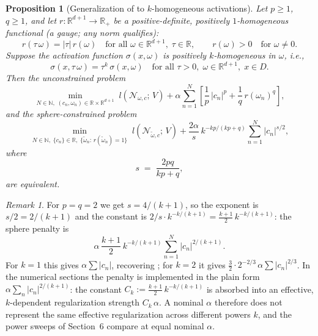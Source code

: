 \documentclass[11pt]{amsart}
\newtheorem{proposition}[theorem]{Proposition}
\theoremstyle{definition}
\theoremstyle{remark}
\newtheorem{remark}[theorem]{Remark}
\begin{document}
\begin{proposition}[Generalization of {\cite[Proposition~3]{pieper2022nonconvex}} to $k$-homogeneous activations]
\label{prop:homogeneous_penalty}
	Let $p \geq 1$, $q \geq 1$, and let $r \colon \mathbb{R}^{d+1} \to \mathbb{R}_+$ be a positive-definite, positively $1$-homogeneous functional (a gauge; any norm qualifies):
	\begin{equation*}
	  r(\tau\,\omega) = |\tau|\, r(\omega) \quad \text{for all } \omega \in \mathbb{R}^{d+1},\; \tau \in \mathbb{R},
	  \qquad r(\omega) > 0 \quad \text{for } \omega \neq 0.
	\end{equation*}
	Suppose the activation function $\sigma(x, \omega)$ is positively $k$-homogeneous in $\omega$, i.e.,
	\begin{equation*}
	  \sigma(x, \tau\,\omega) = \tau^k\, \sigma(x, \omega) \quad \text{for all } \tau > 0,\; \omega \in \mathbb{R}^{d+1},\; x \in D.
	\end{equation*}
	Then the unconstrained problem
	\begin{equation*}
	  \min_{N \in \mathbb{N},\; (c_n, \omega_n) \in \mathbb{R} \times \mathbb{R}^{d+1}}
	  \; l(\mathcal{N}_{\omega,c};\, V)
	  + \alpha \sum_{n=1}^{N} \left[ \frac{1}{p}\,|c_n|^p + \frac{1}{q}\,r(\omega_n)^q \right],
	\end{equation*}
	and the sphere-constrained problem
	\begin{equation*}
	  \min_{N \in \mathbb{N},\; \{c_n\} \in \mathbb{R},\; \{\tilde\omega_n:\, r(\tilde\omega_n) = 1\}}
	  \; l(\mathcal{N}_{\tilde\omega,c};\, V)
	  + \frac{2\alpha}{s}\, k^{-kp/(kp+q)} \sum_{n=1}^{N} |c_n|^{s/2},
	\end{equation*}
	where
	\begin{equation*}
	  s \;=\; \frac{2pq}{kp + q},
	\end{equation*}
	are equivalent.
\end{proposition}
\begin{remark}\leavevmode
	For $p = q = 2$ we get $s = 4/(k+1)$, so the exponent is $s/2 = 2/(k+1)$ and the constant is $2/s \cdot k^{-k/(k+1)} = \frac{k+1}{2}\,k^{-k/(k+1)}$: the sphere penalty is
	\begin{equation*}
	\alpha\,\frac{k+1}{2}\,k^{-k/(k+1)} \sum_{n=1}^N |c_n|^{2/(k+1)}.
	\end{equation*}
	For $k = 1$ this gives $\alpha \sum|c_n|$, recovering \cite[Proposition~3]{pieper2022nonconvex}; for $k = 2$ it gives $\frac{3}{2} \cdot 2^{-2/3}\, \alpha \sum|c_n|^{2/3}$.
	In the numerical sections the penalty is implemented in the plain form
	$\alpha \sum_n |c_n|^{2/(k+1)}$: the constant
	$C_k := \frac{k+1}{2}\, k^{-k/(k+1)}$ is absorbed into an effective,
	$k$-dependent regularization strength $C_k\,\alpha$. A nominal $\alpha$
	therefore does not represent the same effective regularization across
	different powers $k$, and the power sweeps of Section~6 compare at equal
	nominal $\alpha$.
\end{remark}
\end{document}
